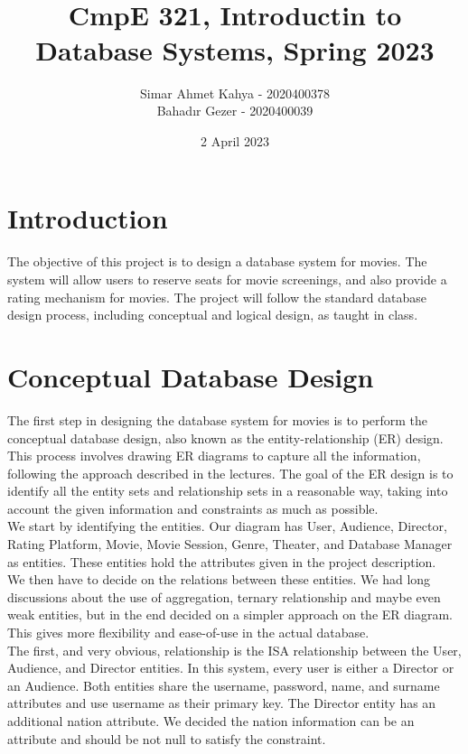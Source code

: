 \documentclass[12pt, A4, titlepage]{article}
\title{\vspace{-2cm} \HHUGE{Project 1} \\ \vspace{1cm} \TitleFont{Movie Database} \\ \vspace{0.7cm} \LARGE CmpE 321, Introductin to Database Systems, Spring 2023 \vspace{6cm}}
\author{
    Simar Ahmet Kahya - 2020400378 \\
    Bahadır Gezer - 2020400039 \\
}
\date{2 April 2023}
\begin{document}
\maketitle

\newpage
\tableofcontents

\newpage
\section{Introduction}

\indent \indent The objective of this project is to design a database system for movies. The system will allow users to reserve seats for movie screenings, and also provide a rating mechanism for movies. The project will follow the standard database design process, including conceptual and logical design, as taught in class.

\section{Conceptual Database Design}

\indent \indent The first step in designing the database system for movies is to perform the conceptual database design, also known as the entity-relationship (ER) design. This process involves drawing ER diagrams to capture all the information, following the approach described in the lectures. The goal of the ER design is to identify all the entity sets and relationship sets in a reasonable way, taking into account the given information and constraints as much as possible. \\

We start by identifying the entities. Our diagram has User, Audience, Director, Rating Platform, Movie, Movie Session, Genre, Theater, and Database Manager as entities. These entities hold the attributes given in the project description. \\

We then have to decide on the relations between these entities. We had long discussions about the use of aggregation, ternary relationship and maybe even weak entities, but in the end decided on a simpler approach on the ER diagram. This gives more flexibility and ease-of-use in the actual database. \\

The first, and very obvious, relationship is the ISA relationship between the User, Audience, and Director entities. In this system, every user is either a Director or an Audience. Both entities share the username, password, name, and surname attributes and use username as their primary key. The Director entity has an additional nation attribute. We decided the nation information can be an attribute and should be not null to satisfy the constraint. \\
\end{document}
